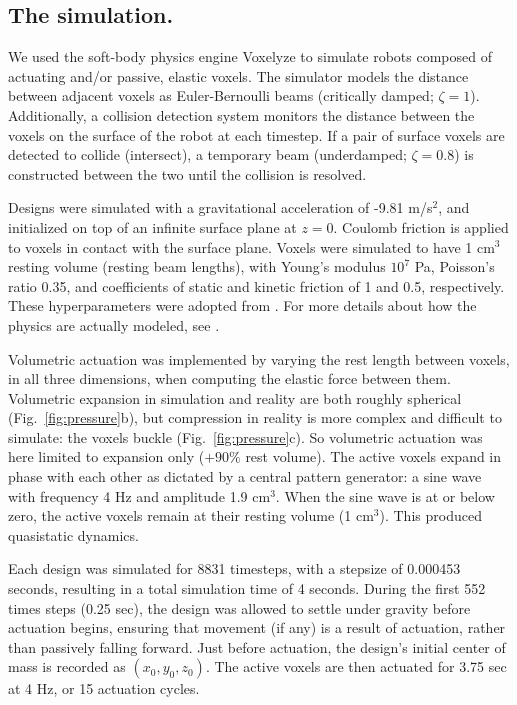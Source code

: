 \subsection*{The simulation.}

We used the soft-body physics engine Voxelyze \cite{hiller2014dynamic} to simulate robots composed of actuating and/or passive, elastic voxels.
The simulator models the distance between adjacent voxels as Euler-Bernoulli beams (critically damped; $\zeta=1$).
Additionally, a collision detection system monitors the distance between the voxels on the surface of the robot at each timestep.
If a pair of surface voxels are detected to collide (intersect), a temporary beam (underdamped; $\zeta=0.8$) is constructed between the two until the collision is resolved. 

Designs were simulated with a gravitational acceleration of -9.81 m/s$^2$, and initialized on top of an infinite surface plane at $z=0$.
Coulomb friction is applied to voxels in contact with the surface plane.
Voxels were simulated to have 1 cm$^3$ resting volume (resting beam lengths), with Young's modulus $10^7$ Pa, Poisson's ratio 0.35, 
and coefficients of static and kinetic friction of 1 and 0.5, respectively.
These hyperparameters were adopted from \cite{kriegman2019automated}.
For more details about how the physics are actually modeled, see \cite{hiller2014dynamic}.

Volumetric actuation was implemented by varying the rest length between voxels, in all three dimensions, when computing the elastic force between them.
Volumetric expansion in simulation and reality are both roughly spherical
(Fig.~\ref{fig:pressure}b), but compression in reality is more complex
and difficult to simulate: 
the voxels buckle (Fig.~\ref{fig:pressure}c).
So volumetric actuation was here limited to expansion only ($+90\%$ rest volume).
The active voxels expand in phase with each other 
as dictated by
a central pattern generator:
a sine wave with frequency 4 Hz and amplitude 1.9 cm$^3$.
When the sine wave is at or below zero, the active voxels remain at their resting volume (1 cm$^3$).
This produced quasistatic dynamics.

Each design was simulated for 8831 timesteps, with a stepsize of 0.000453 seconds, resulting in a total simulation time of 4 seconds.
During the first 552 times steps (0.25 sec), the design was allowed to settle under gravity before actuation begins, ensuring that movement (if any) is a result of actuation, rather than passively falling forward.
Just before actuation, the design's initial center of mass is recorded as $(x_0, y_0, z_0)$.
The active voxels are then actuated for 3.75 sec at 4 Hz, or 15 actuation cycles.

